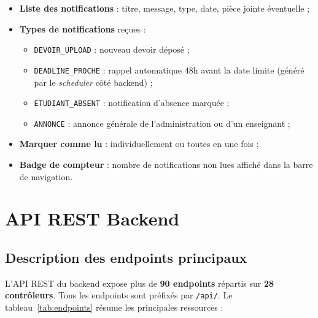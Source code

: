 \begin{itemize}[noitemsep]
    \item \textbf{Liste des notifications} : titre, message, type, date, pièce jointe éventuelle ;
    \item \textbf{Types de notifications} reçues :
    \begin{itemize}[noitemsep]
        \item \texttt{DEVOIR\_UPLOAD} : nouveau devoir déposé ;
        \item \texttt{DEADLINE\_PROCHE} : rappel automatique 48h avant la date limite (généré par le \textit{scheduler} côté backend) ;
        \item \texttt{ETUDIANT\_ABSENT} : notification d'absence marquée ;
        \item \texttt{ANNONCE} : annonce générale de l'administration ou d'un enseignant ;
    \end{itemize}
    \item \textbf{Marquer comme lu} : individuellement ou toutes en une fois ;
    \item \textbf{Badge de compteur} : nombre de notifications non lues affiché dans la barre de navigation.
\end{itemize}

\section{API REST Backend}

\subsection{Description des endpoints principaux}

L'API REST du backend expose plus de \textbf{90 endpoints} répartis sur \textbf{28 contrôleurs}. Tous les endpoints sont préfixés par \texttt{/api/}. Le tableau~\ref{tab:endpoints} résume les principales ressources :

